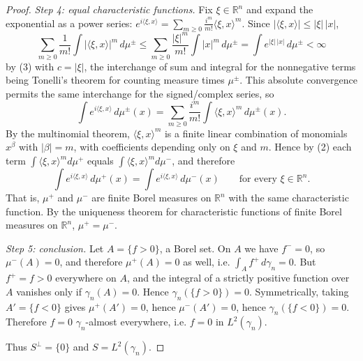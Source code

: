 \begin{proof}
\emph{Step 4: equal characteristic functions.}
Fix $\xi \in \mathbb{R}^n$ and expand the exponential as a power series:
$e^{i\langle \xi, x\rangle} = \sum_{m\geq0} \frac{i^m}{m!}\langle\xi,x\rangle^m$.
Since $|\langle\xi,x\rangle| \leq |\xi|\,|x|$,
\[
  \sum_{m\geq0}\frac{1}{m!}\int \bigl|\langle\xi,x\rangle\bigr|^m\, d\mu^\pm
    \leq \sum_{m\geq0}\frac{|\xi|^m}{m!}\int |x|^m\, d\mu^\pm
    = \int e^{|\xi|\,|x|}\, d\mu^\pm < \infty
\]
by (3) with $c = |\xi|$, the interchange of sum and integral for the nonnegative
terms being Tonelli's theorem for counting measure times $\mu^\pm$.  This
absolute convergence permits the same interchange for the signed/complex series,
so
\[
  \int e^{i\langle\xi,x\rangle}\, d\mu^\pm(x)
    = \sum_{m\geq0}\frac{i^m}{m!}\int \langle\xi,x\rangle^m \, d\mu^\pm(x) .
\]
By the multinomial theorem, $\langle\xi,x\rangle^m$ is a finite linear
combination of monomials $x^\beta$ with $|\beta| = m$, with coefficients
depending only on $\xi$ and $m$.  Hence by (2) each term
$\int\langle\xi,x\rangle^m d\mu^+$ equals $\int\langle\xi,x\rangle^m d\mu^-$, and
therefore
\[
  \int e^{i\langle\xi,x\rangle}\, d\mu^+(x)
    = \int e^{i\langle\xi,x\rangle}\, d\mu^-(x)
  \qquad\text{for every } \xi \in \mathbb{R}^n .
\]
That is, $\mu^+$ and $\mu^-$ are finite Borel measures on $\mathbb{R}^n$ with the
same characteristic function.  By the uniqueness theorem for characteristic
functions of finite Borel measures on $\mathbb{R}^n$, $\mu^+ = \mu^-$.

\emph{Step 5: conclusion.}
Let $A = \{f > 0\}$, a Borel set.  On $A$ we have $f^- = 0$, so
$\mu^-(A) = 0$, and therefore $\mu^+(A) = 0$ as well, i.e.
$\int_A f^+ \, d\gamma_n = 0$.  But $f^+ = f > 0$ everywhere on $A$, and the
integral of a strictly positive function over $A$ vanishes only if
$\gamma_n(A) = 0$.  Hence $\gamma_n(\{f>0\}) = 0$.  Symmetrically, taking
$A' = \{f<0\}$ gives $\mu^+(A') = 0$, hence $\mu^-(A') = 0$, hence
$\gamma_n(\{f<0\}) = 0$.  Therefore $f = 0$ $\gamma_n$-almost everywhere, i.e.
$f = 0$ in $L^2(\gamma_n)$.

Thus $S^\perp = \{0\}$ and $S = L^2(\gamma_n)$.
\end{proof}

